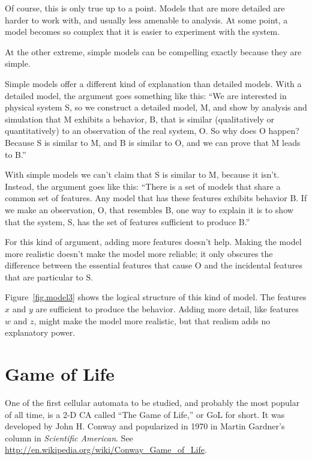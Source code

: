 \documentclass[10pt]{book}
\begin{document}
Of course, this is only true up to a point.  Models that are
more detailed are harder to work with, and usually less
amenable to analysis.  At some point, a model becomes so complex
that it is easier to experiment with the system.

At the other extreme, simple models can be compelling
exactly because they are simple.

Simple models offer a different kind of explanation than detailed
models.  With a detailed model, the argument goes something
like this: ``We are interested in physical system S, so we
construct a detailed model, M, and show by analysis and simulation
that M exhibits a behavior, B, that is similar (qualitatively
or quantitatively) to an observation of the real system, O.
So why does O happen?  Because S is similar to M, and
B is similar to O, and we can prove that M leads to B.''

With simple models we can't claim that S is similar to M, because it
isn't.  Instead, the argument goes like this: ``There is a set of models
that share a common set of features.  Any model that has these
features exhibits behavior B.  If we make an observation, O, that
resembles B, one way to explain it is to show that the system, S, has
the set of features sufficient to produce B.''

For this kind of argument, adding more features doesn't help.  Making
the model more realistic doesn't make the model more reliable; it only
obscures the difference between the essential features that cause O
and the incidental features that are particular to S.

Figure~\ref{fig.model3} shows the logical structure of this kind of
model.  The features $x$ and $y$ are sufficient to produce the
behavior.  Adding more detail, like features $w$ and $z$, might make
the model more realistic, but that realism adds no explanatory power.


\chapter{Game of Life}
\label{life}

One of the first cellular automata to be studied, and probably the
most popular of all time, is a 2-D CA called ``The Game of Life,'' or GoL
for short.  It was developed by John H. Conway and popularized in 1970
in Martin Gardner's column in {\em Scientific American}.
See \url{http://en.wikipedia.org/wiki/Conway_Game_of_Life}.
\end{document}
